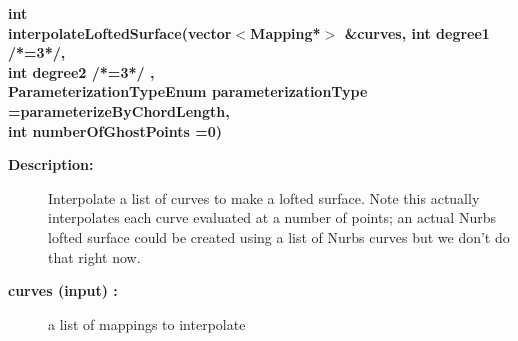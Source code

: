 \begin{flushleft} \textbf{%
int  \\ 
\settowidth{\NurbsMappingIncludeArgIndent}{interpolateLoftedSurface(}%
interpolateLoftedSurface(vector$<$Mapping*$>$ \&curves, int degree1 /*=3*/, \\ 
\hspace{\NurbsMappingIncludeArgIndent}int degree2 /*=3*/ ,\\ 
\hspace{\NurbsMappingIncludeArgIndent}ParameterizationTypeEnum  parameterizationType  =parameterizeByChordLength,\\ 
\hspace{\NurbsMappingIncludeArgIndent}int numberOfGhostPoints  =0)
}\end{flushleft}
\begin{description}
\item[{\bf Description:}] 
    Interpolate a list of curves to make a lofted surface.  Note this actually
    interpolates each curve evaluated at a number of points; an actual Nurbs lofted
    surface could be created using a list of Nurbs curves but we don't do that 
    right now.

\item[{\bf curves (input) :}]  a list of mappings to interpolate
\end{description}
